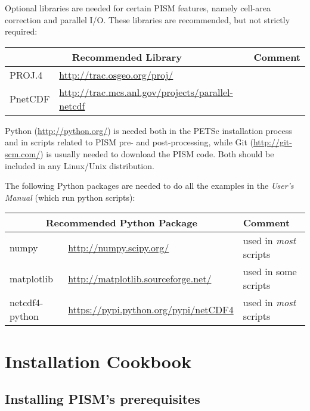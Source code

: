 \documentclass[titlepage,letterpaper,final]{scrartcl}
\begin{document}
Optional libraries are needed for certain PISM features, namely cell-area correction and parallel I/O.  These libraries are recommended, but not strictly required: \bigskip

\begin{center}
  \begin{tabular}{lll}
    \toprule
    \multicolumn{2}{c}{\textbf{Recommended Library}} & \textbf{Comment}\\
    \midrule
    PROJ.4 & \url{http://trac.osgeo.org/proj/} & \\
    PnetCDF & \url{http://trac.mcs.anl.gov/projects/parallel-netcdf} & \\
   \bottomrule
  \end{tabular}
\end{center}

\bigskip

Python (\url{http://python.org/}) is needed both in the PETSc installation process and in scripts related to PISM pre- and post-processing, while Git (\url{http://git-scm.com/}) is usually needed to download the PISM code.  Both should be included in any Linux/Unix distribution.

The following Python packages are needed to do all the examples in the \emph{User's Manual} (which run python scripts):
\bigskip

\begin{center}
  \begin{tabular}{lll}
    \toprule
    \multicolumn{2}{c}{\textbf{Recommended Python Package}} & \textbf{Comment}\\
    \midrule
    numpy & \url{http://numpy.scipy.org/} & used in \emph{most} scripts \\
    matplotlib & \url{http://matplotlib.sourceforge.net/} & used in some scripts \\
    netcdf4-python & \url{https://pypi.python.org/pypi/netCDF4} & used in \emph{most} scripts \\
   \bottomrule
  \end{tabular}
\end{center}


\section{Installation Cookbook}\label{sec:cookbook}

\subsection{Installing PISM's prerequisites} \label{subsec:prereq}
\end{document}

